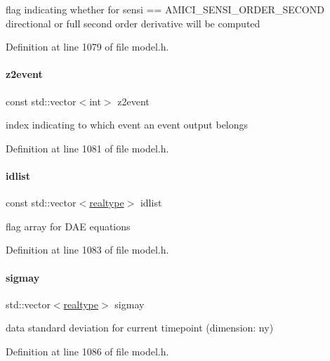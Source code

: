 flag indicating whether for sensi == A\+M\+I\+C\+I\+\_\+\+S\+E\+N\+S\+I\+\_\+\+O\+R\+D\+E\+R\+\_\+\+S\+E\+C\+O\+ND directional or full second order derivative will be computed 

Definition at line 1079 of file model.\+h.

\mbox{\label{classamici_1_1_model_af3343032542edf755502ca03f125a3e4}} 
\paragraph{\texorpdfstring{z2event}{z2event}}
{\footnotesize\ttfamily const std\+::vector$<$int$>$ z2event}

index indicating to which event an event output belongs 

Definition at line 1081 of file model.\+h.

\mbox{\label{classamici_1_1_model_a3eadbed11a3c95f9d046633151414420}} 
\paragraph{\texorpdfstring{idlist}{idlist}}
{\footnotesize\ttfamily const std\+::vector$<$\mbox{\hyperlink{namespaceamici_a1bdce28051d6a53868f7ccbf5f2c14a3}{realtype}}$>$ idlist}

flag array for D\+AE equations 

Definition at line 1083 of file model.\+h.

\mbox{\label{classamici_1_1_model_a7dc280c0479f4a1fffe67fea251c26d2}} 
\paragraph{\texorpdfstring{sigmay}{sigmay}}
{\footnotesize\ttfamily std\+::vector$<$\mbox{\hyperlink{namespaceamici_a1bdce28051d6a53868f7ccbf5f2c14a3}{realtype}}$>$ sigmay}

data standard deviation for current timepoint (dimension\+: ny) 

Definition at line 1086 of file model.\+h.

